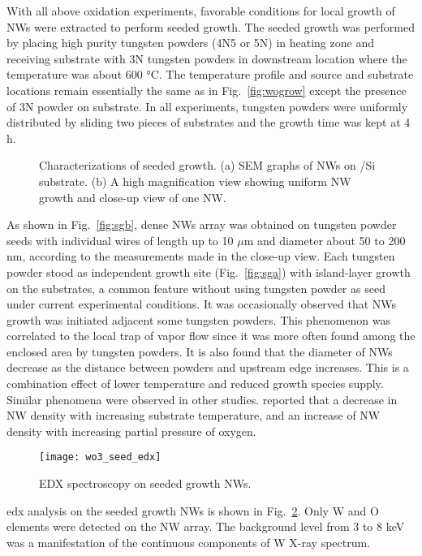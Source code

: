 With all above oxidation experiments, favorable conditions for local growth of NWs were extracted to perform seeded growth. The seeded growth was performed by placing high purity tungsten powders (4N5 or 5N) in heating zone and receiving substrate with 3N tungsten powders in downstream location where the temperature was about 600 \si{\degreeCelsius}. The temperature profile and source and substrate locations remain essentially the same as in Fig.~\ref{fig:wogrow} except the presence of 3N powder on substrate. In all experiments, tungsten powders were uniformly distributed by sliding two pieces of substrates and the growth time was kept at 4 h.
\begin{figure}[htb]
\centering
{}\hspace{0.04\textwidth}
\caption[Characterization of seeded growth : SEM]{Characterizations of seeded growth. (a) SEM graphs of  NWs on /Si substrate. (b) A high magnification view showing uniform NW growth and close-up view of one NW. }
\label{fig:woseedsem}
\end{figure}
As shown in Fig.~\ref{fig:sgb}, dense NWs array was obtained on tungsten powder seeds with individual wires of length up to 10 $\mu$m and diameter about 50 to 200 nm, according to the measurements made in the close-up view. Each tungsten powder stood as independent growth site (Fig.~\ref{fig:sga}) with island-layer growth on the substrates, a common feature without using tungsten powder as seed under current experimental conditions. It was occasionally observed that NWs growth was initiated adjacent some tungsten powders. This phenomenon was correlated to the local trap of vapor flow since it was more often found among the enclosed area by tungsten powders. It is also found that the diameter of NWs decrease as the distance between powders and upstream edge increases. This is a combination effect of lower temperature and reduced  growth species supply. Similar phenomena were observed in other studies. \citeauthor{Thangala2007} reported that a decrease in NW density with increasing substrate temperature, and an increase of NW density with increasing partial pressure of oxygen.\cite{Thangala2007}

\begin{figure}[htb]
\centering
\texttt{[image: wo3\_seed\_edx]}
\caption[Composition analysis on seeded growth  NWs]{EDX spectroscopy on seeded growth  NWs.}
\label{fig:woedx}
\end{figure}
\gls{edx} analysis on the seeded growth  NWs is shown in Fig.~\ref{fig:woedx}. Only W and O elements were detected on the NW array. The background level from 3 to 8 keV was a manifestation of the continuous components of W X-ray spectrum. 

